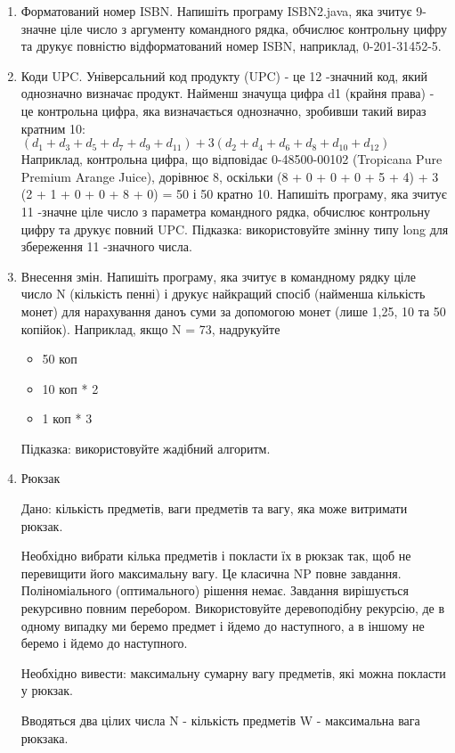\documentclass[]{article}
\begin{document}
\begin{enumerate}
\item Форматований номер ISBN.
Напишіть програму ISBN2.java, яка зчитує 9-значне ціле число з аргументу командного рядка,
обчислює контрольну цифру та друкує повністю відформатований номер ISBN, наприклад, 0-201-31452-5.

\item   <200b><200b>Коди UPC. Універсальний код продукту (UPC) - це 12 -значний код, який однозначно визначає продукт.
Найменш значуща цифра d1 (крайня права) - це контрольна цифра, яка визначається однозначно, зробивши такий вираз кратним 10:
$(d_1 + d_3 + d_5 + d_7 + d_9 + d_{11}) + 3 (d_2 + d_4 + d_6 + d_8 + d_{10} + d_{12})$
Наприклад, контрольна цифра, що відповідає 0-48500-00102 (Tropicana Pure Premium Arange Juice), дорівнює 8, оскільки
(8 + 0 + 0 + 0 + 5 + 4) + 3 (2 + 1 + 0 + 0 + 8 + 0) = 50
і 50 кратно 10.
Напишіть програму, яка зчитує 11 -значне ціле число з параметра командного рядка,
обчислює контрольну цифру та друкує повний UPC.
Підказка: використовуйте змінну типу long для збереження 11 -значного числа.

\item Внесення змін. Напишіть програму, яка зчитує в командному рядку ціле число N (кількість пенні) і друкує найкращий спосіб
(найменша кількість монет) для нарахування даноъ суми за допомогою монет (лише 1,25, 10 та 50 копійок).
Наприклад, якщо N = 73, надрукуйте
\begin{itemize}
\item  50 коп
\item  10 коп * 2
\item  1 коп * 3
\end{itemize}
Підказка: використовуйте жадібний алгоритм. 


\item
Рюкзак 

Дано: кількість предметів, ваги предметів та вагу, яка може витримати рюкзак.

Необхідно вибрати кілька предметів і покласти їх в рюкзак так, щоб не перевищити його максимальну вагу. Це класична NP повне завдання. Поліноміального (оптимального) рішення немає. Завдання вирішується рекурсивно повним перебором. Використовуйте деревоподібну рекурсію, де в одному випадку ми беремо предмет і йдемо до наступного, а в іншому не беремо і йдемо до наступного.

Необхідно вивести: максимальну сумарну вагу предметів, які можна покласти у рюкзак.

Вводяться два цілих числа N - кількість предметів W - максимальна вага рюкзака.


\end{enumerate}
\end{document}
